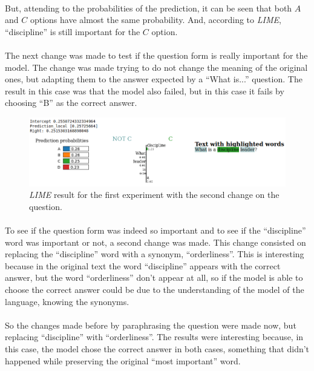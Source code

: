 \paragraph{}
But, attending to the probabilities of the prediction, it can be seen that both $A$ and $C$ options have almost the same probability. And, according to \emph{LIME}, ``discipline'' is still important for the $C$ option.

\paragraph{}
The next change was made to test if the question form is really important for the model. The change was made trying to do not change the meaning of the original ones, but adapting them to the answer expected by a ``What is...'' question.
The result in this case was that the model also failed, but in this case it fails by choosing ``B'' as the correct answer.
\begin{figure}[!h]
	\centering
	\includegraphics[scale=0.35]{images/lime-ex1-example1-modB-real}
	\caption{\emph{LIME} result for the first experiment with the second change on the question.}
	\label{fig:lime-result-q-1c}
\end{figure}

\paragraph{}
To see if the question form was indeed so important and to see if the ``discipline'' word was important or not, a second change was made. This change consisted on replacing the ``discipline'' word with a synonym, ``orderliness''. This is interesting because in the original text the word ``discipline'' appears with the correct answer, but the word ``orderliness'' don't appear at all, so if the model is able to choose the correct answer could be due to the understanding of the model of the language, knowing the synonyms. 
\paragraph{}
So the changes made before by paraphrasing the question were made now, but replacing ``discipline'' with ``orderliness''. The results were interesting because, in this case, the model chose the correct answer in both cases, something that didn't happened while preserving the original ``most important'' word. 
